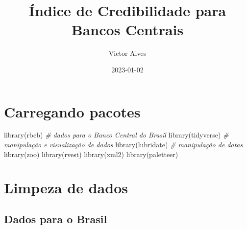 \documentclass[
]{article}
\title{Índice de Credibilidade para Bancos Centrais}
\author{Victor Alves}
\date{2023-01-02}
\newenvironment{Shaded}{\begin{snugshade}}{\end{snugshade}}
\newcommand{\AttributeTok}[1]{\textcolor[rgb]{0.77,0.63,0.00}{#1}}
\newcommand{\CommentTok}[1]{\textcolor[rgb]{0.56,0.35,0.01}{\textit{#1}}}
\newcommand{\FunctionTok}[1]{\textcolor[rgb]{0.00,0.00,0.00}{#1}}
\newcommand{\NormalTok}[1]{#1}
\newcommand{\OtherTok}[1]{\textcolor[rgb]{0.56,0.35,0.01}{#1}}
\newcommand{\SpecialCharTok}[1]{\textcolor[rgb]{0.00,0.00,0.00}{#1}}
\newcommand{\StringTok}[1]{\textcolor[rgb]{0.31,0.60,0.02}{#1}}
\begin{document}
\maketitle

{
\setcounter{tocdepth}{2}
\tableofcontents
}
\hypertarget{carregando-pacotes}{%
\section{Carregando pacotes}\label{carregando-pacotes}}

\begin{Shaded}
\begin{Highlighting}[]
\FunctionTok{library}\NormalTok{(rbcb) }\CommentTok{\# dados para o Banco Central do Brasil}
\FunctionTok{library}\NormalTok{(tidyverse) }\CommentTok{\# manipulação e visualização de dados}
\FunctionTok{library}\NormalTok{(lubridate) }\CommentTok{\# manipulação de datas}
\FunctionTok{library}\NormalTok{(zoo)}
\FunctionTok{library}\NormalTok{(rvest)}
\FunctionTok{library}\NormalTok{(xml2)}
\FunctionTok{library}\NormalTok{(paletteer)}
\end{Highlighting}
\end{Shaded}

\hypertarget{limpeza-de-dados}{%
\section{Limpeza de dados}\label{limpeza-de-dados}}

\begin{Shaded}
\end{Shaded}

\hypertarget{dados-para-o-brasil}{%
\subsection{Dados para o Brasil}\label{dados-para-o-brasil}}
\end{document}
